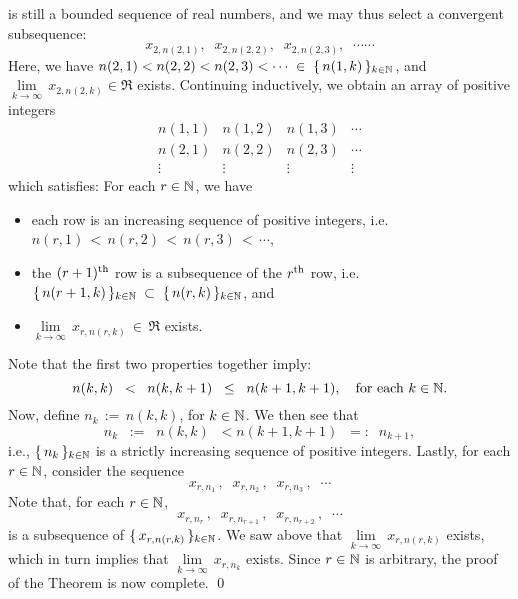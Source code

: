 is still a bounded sequence of real numbers, and we may thus
select a convergent subsequence:
\begin{equation*}
x_{2,n(2,1)},\;\;
x_{2,n(2,2)},\;\; 
x_{2,n(2,3)},\;\;
\cdots\cdots 
\end{equation*}
Here, we have $n(2,1) < n(2,2) < n(2,3) < \cdots \;\in\;\{\,n(1,k)\,\}_{k\in\mathbb{N}}$, and
$\underset{k\rightarrow\infty}{\lim}\,x_{2,n(2,k)} \in \Re$ exists.
Continuing inductively, we obtain an array of positive integers
\begin{equation*}
\begin{array}{cccc}
n(1,1) & n(1,2) & n(1,3) & \cdots \\
n(2,1) & n(2,2) & n(2,3) & \cdots \\
\vdots & \vdots & \vdots & \vdots  
\end{array}
\end{equation*}
which satisfies: For each $r \in \mathbb{N}$, we have
\begin{itemize}
\item	each row is an increasing sequence of positive integers, i.e. $n(r,1) \,<\, n(r,2) \,<\, n(r,3) \,<\, \cdots$,
\item	the $(r+1)^{\textnormal{th}}$ row is a subsequence of the $r^{\textnormal{th}}$ row, i.e.
		$\{\,n(r+1,k)\,\}_{k\in\mathbb{N}} \;\subset\; \{\,n(r,k)\,\}_{k\in\mathbb{N}}$,
		and
\item	$\underset{k\rightarrow\infty}{\lim}\,x_{r,n(r,k)} \,\in\, \Re$ exists.
\end{itemize}
Note that the first two properties together imply:
\begin{equation*}
n(k,k) \;\;<\;\; n(k,k+1) \;\;\leq\;\; n(k+1,k+1),
\quad
\textnormal{for each $k \in \mathbb{N}$}.
\end{equation*} 
Now, define $n_{k} \,:=\, n(k,k)$, for $k \in \mathbb{N}$.
We then see that
\begin{equation*}
n_{k} \;\; := \;\; n(k,k) \;\; < n(k+1,k+1) \;\; =: \;\; n_{k+1},
\end{equation*}
i.e., $\{\,n_{k}\,\}_{k\in\mathbb{N}}$ is a strictly increasing sequence of positive integers.
Lastly, for each $r \in \mathbb{N}$, consider the sequence
\begin{equation*}
x_{r,n_{1}}\,,\;\;
x_{r,n_{2}}\,,\;\;
x_{r,n_{3}}\,,\;\;
\cdots
\end{equation*}
Note that, for each $r \in \mathbb{N}$,
\begin{equation*}
x_{r,n_{r}}\,,\;\;
x_{r,n_{r+1}}\,,\;\;
x_{r,n_{r+2}}\,,\;\;
\cdots
\end{equation*}
is a subsequence of $\{\,x_{r,n(r,k)}\,\}_{k\in\mathbb{N}}$.
We saw above that $\underset{k\rightarrow\infty}{\lim}\,x_{r,n(r,k)}$ exists,
which in turn implies that $\underset{k\rightarrow\infty}{\lim}\,x_{r,n_{k}}$ exists.
Since $r \in \mathbb{N}$ is arbitrary, the proof of the Theorem is now complete.
\qed

